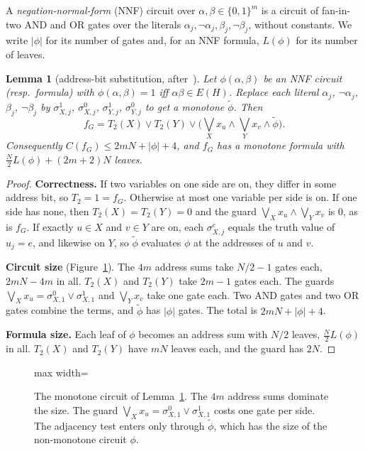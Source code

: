 \documentclass[11pt]{article}
\newtheorem{lemma}[theorem]{Lemma}
\theoremstyle{definition}
\theoremstyle{remark}
\newcommand{\Csize}{C}
\begin{document}
A \emph{negation-normal-form} (NNF) circuit over $\alpha,\beta\in\{0,1\}^m$ is a circuit of fan-in-two AND and OR gates
over the literals $\alpha_j,\neg\alpha_j,\beta_j,\neg\beta_j$, without constants. We write $|\phi|$ for its number of
gates and, for an NNF formula, $L(\phi)$ for its number of leaves.

\begin{lemma}[address-bit substitution, after~\cite{Juk06}]\label{lem:subst}
Let $\phi(\alpha,\beta)$ be an NNF circuit (resp.\ formula) with $\phi(\alpha,\beta)=1$ iff $\alpha\beta\in E(H)$.
Replace each literal $\alpha_j$, $\neg\alpha_j$, $\beta_j$, $\neg\beta_j$ by $\sigma^1_{X,j}$, $\sigma^0_{X,j}$,
$\sigma^1_{Y,j}$, $\sigma^0_{Y,j}$ to get a monotone $\tilde\phi$. Then
\[ f_G = T_2(X)\vee T_2(Y)\vee\Big(\textstyle\bigvee_{X}x_u\wedge\bigvee_{Y}x_v\wedge\tilde\phi\Big). \]
Consequently $\Csize(f_G)\le 2mN+|\phi|+4$, and $f_G$ has a monotone formula with $\tfrac N2 L(\phi)+(2m+2)N$ leaves.
\end{lemma}

\begin{proof}
\textbf{Correctness.} If two variables on one side are on, they differ in some address bit, so $T_2=1=f_G$. Otherwise
at most one variable per side is on. If one side has none, then $T_2(X)=T_2(Y)=0$ and the guard
$\bigvee_Xx_u\wedge\bigvee_Yx_v$ is $0$, as is $f_G$. If exactly $u\in X$ and $v\in Y$ are on, each $\sigma^e_{X,j}$
equals the truth value of $u_j=e$, and likewise on $Y$, so $\tilde\phi$ evaluates $\phi$ at the addresses of $u$ and
$v$.

\textbf{Circuit size} (Figure~\ref{fig:upper}). The $4m$ address sums take $N/2-1$ gates each, $2mN-4m$ in all.
$T_2(X)$ and $T_2(Y)$ take $2m-1$ gates each. The guards $\bigvee_X x_u=\sigma^0_{X,1}\vee\sigma^1_{X,1}$ and
$\bigvee_Y x_v$ take one gate each. Two AND gates and two OR gates combine the terms, and $\tilde\phi$ has $|\phi|$
gates. The total is $2mN+|\phi|+4$.

\textbf{Formula size.} Each leaf of $\phi$ becomes an address sum with $N/2$ leaves, $\frac N2L(\phi)$ in all.
$T_2(X)$ and $T_2(Y)$ have $mN$ leaves each, and the guard has $2N$.
\end{proof}

\begin{figure}[t]
\centering
\begin{adjustbox}{max width=\linewidth}

\end{adjustbox}
\caption{The monotone circuit of Lemma~\ref{lem:subst}. The $4m$ address sums dominate the size. The guard
$\bigvee_X x_u=\sigma^0_{X,1}\vee\sigma^1_{X,1}$ costs one gate per side. The adjacency test enters only through
$\tilde\phi$, which has the size of the non-monotone circuit $\phi$.}\label{fig:upper}
\end{figure}
\end{document}
